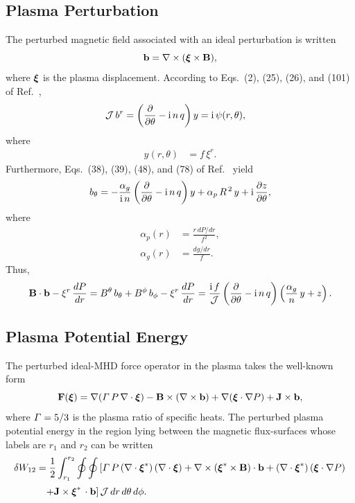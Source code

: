 \documentclass[12pt,prb,aps]{revtex4-1}
\newcommand {\bxi}{\mbox{\boldmath$\xi$}}
\begin{document}
\subsection{Plasma Perturbation}
The perturbed magnetic field associated with an ideal perturbation is written\,\cite{freidberg,ideal}
\begin{equation}
{\bf b} = \nabla\times (\bxi\times{\bf B}),
\end{equation}
where $\bxi$ is the plasma displacement.  According to Eqs.~(2), (25), (26), and
(101) of Ref.~, 
\begin{align}\label{e9}
{\cal J}\,b^r&=\left(\frac{\partial}{\partial\theta}-{\rm i}\,n\,q\right)y = {\rm i}\,\psi(r,\theta),
\end{align}
where
\begin{align}\label{e10}
y(r,\theta)&= f\,\xi^r.
\end{align}
Furthermore,  Eqs.~(38), (39),  (48), and (78) of Ref.~ yield
\begin{align}
b_\theta = -\frac{\alpha_g}{{\rm i}\,n}\left(\frac{\partial}{\partial\theta} - {\rm i}\,n\,q\right)y +\alpha_p\,R^{\,2}\,y +{\rm i}\,\frac{\partial z}{\partial\theta},
\end{align}
where
\begin{align}
\alpha_p(r) &= \frac{r\,dP/dr}{f^2},\label{ap}\\[0.5ex]
\alpha_g (r)&= \frac{dg/dr}{f}.\label{ag}
\end{align}
Thus,
\begin{equation}\label{e15}
{\bf B}\cdot{\bf b} -\xi^r\,\frac{dP}{dr} = B^\theta\,b_\theta+B^\phi\,b_\phi - \xi^r\,\frac{dP}{dr}=
\frac{{\rm i}\,f}{\cal J}\left(\frac{\partial}{\partial\theta}- {\rm i}\,n\,q\right)\left(\frac{\alpha_g}{n}\,y+z\right).
\end{equation}

\subsection{Plasma Potential Energy}
The perturbed ideal-MHD  force operator in the plasma takes the well-known form\,\cite{freidberg,ideal}
\begin{equation}
{\bf F}(\bxi)= \nabla({\mit\Gamma}\,P\,\nabla\cdot\bxi) - {\bf B}\times(\nabla\times {\bf b})+\nabla(\bxi\cdot\nabla P)+{\bf J}\times  {\bf b},
\end{equation}
where ${\mit\Gamma}=5/3$ is the plasma ratio of specific heats. 
The perturbed  plasma potential energy in the region lying between the magnetic  flux-surfaces whose labels are $r_1$ and $r_2$ can be written\,\cite{ideal}
\begin{align}
\delta W_{12} &= \frac{1}{2}\int_{r_1}^{r_2}\oint\oint\left[{\mit\Gamma}\,P\,(\nabla\cdot\bxi^\ast)\,(\nabla\cdot\bxi)+ \nabla\times (\bxi^\ast\times {\bf B})\cdot {\bf b}
+(\nabla\cdot\bxi^\ast)\,(\bxi\cdot\nabla P)\right.\nonumber\\[0.5ex]&\phantom{=}
\left.+{\bf J}\times \bxi^\ast\,\cdot{\bf b}\right]{\cal J}\,dr\,d\theta\,d\phi.
\end{align}
\end{document}
